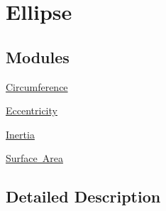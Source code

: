 \hypertarget{group___e_g_x_math-_geometry-2_d-_ellipse}{}\section{Ellipse}
\label{group___e_g_x_math-_geometry-2_d-_ellipse}
\subsection*{Modules}
\begin{DoxyCompactItemize}
\item 
\mbox{\hyperlink{group___e_g_x_math-_geometry-2_d-_ellipse-_circumference}{Circumference}}
\item 
\mbox{\hyperlink{group___e_g_x_math-_geometry-2_d-_ellipse-_eccentricity}{Eccentricity}}
\item 
\mbox{\hyperlink{group___e_g_x_math-_geometry-2_d-_ellipse-_inertia}{Inertia}}
\item 
\mbox{\hyperlink{group___e_g_x_math-_geometry-2_d-_ellipse-_surface_area}{Surface Area}}
\end{DoxyCompactItemize}


\subsection{Detailed Description}

